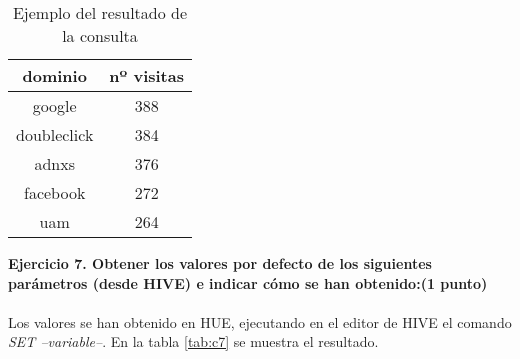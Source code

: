 \begin{table}[ht]
	\centering
	\caption{Ejemplo del resultado de la consulta}
	\begin{tabular}[t]{cc}
		dominio & nº visitas \\
		\hline
		google	& 388 \\
		doubleclick&	384\\
		adnxs&	376\\
		facebook&	272\\
		uam	&264\\
	\end{tabular}
	\label{tab:c6}
\end{table}%
\textbf{Ejercicio 7. Obtener los valores por defecto de los siguientes parámetros (desde HIVE) e indicar cómo se
	han obtenido:(1 punto)}\\\\
Los valores se han obtenido en HUE, ejecutando en el editor de HIVE el comando \textit{SET {--variable--}}. En la tabla \ref{tab:c7} se muestra el resultado.

